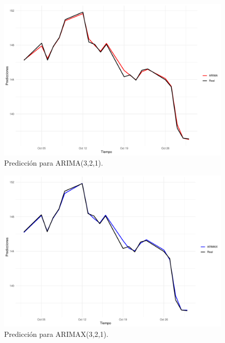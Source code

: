 \documentclass[conference]{IEEEtran}
\begin{document}
\begin{figure}
    \centering
    \includegraphics[width=\columnwidth]{figs/all1.pdf}
    \caption{Predicción para ARIMA(3,2,1).}
    \label{fig:pred_data_1}
\end{figure}

\begin{figure}
    \centering
    \includegraphics[width=\columnwidth]{figs/all2.pdf}
    \caption{Predicción para ARIMAX(3,2,1).}
\end{figure}
\end{document}
